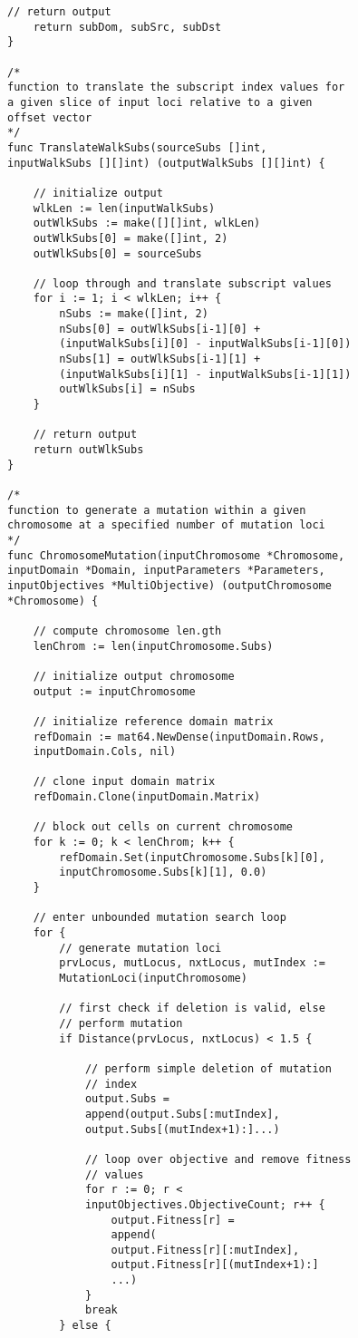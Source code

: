 \begin{lstlisting}[basicstyle=\small]
	// return output
	return subDom, subSrc, subDst
}

/* 
function to translate the subscript index values for 
a given slice of input loci relative to a given 
offset vector
*/
func TranslateWalkSubs(sourceSubs []int, 
inputWalkSubs [][]int) (outputWalkSubs [][]int) {

	// initialize output
	wlkLen := len(inputWalkSubs)
	outWlkSubs := make([][]int, wlkLen)
	outWlkSubs[0] = make([]int, 2)
	outWlkSubs[0] = sourceSubs

	// loop through and translate subscript values
	for i := 1; i < wlkLen; i++ {
		nSubs := make([]int, 2)
		nSubs[0] = outWlkSubs[i-1][0] + 
		(inputWalkSubs[i][0] - inputWalkSubs[i-1][0])
		nSubs[1] = outWlkSubs[i-1][1] + 
		(inputWalkSubs[i][1] - inputWalkSubs[i-1][1])
		outWlkSubs[i] = nSubs
	}

	// return output
	return outWlkSubs
}

/* 
function to generate a mutation within a given 
chromosome at a specified number of mutation loci
*/
func ChromosomeMutation(inputChromosome *Chromosome, 
inputDomain *Domain, inputParameters *Parameters, 
inputObjectives *MultiObjective) (outputChromosome 
*Chromosome) {

	// compute chromosome len.gth
	lenChrom := len(inputChromosome.Subs)

	// initialize output chromosome
	output := inputChromosome

	// initialize reference domain matrix
	refDomain := mat64.NewDense(inputDomain.Rows, 
	inputDomain.Cols, nil)

	// clone input domain matrix
	refDomain.Clone(inputDomain.Matrix)

	// block out cells on current chromosome
	for k := 0; k < lenChrom; k++ {
		refDomain.Set(inputChromosome.Subs[k][0], 
		inputChromosome.Subs[k][1], 0.0)
	}

	// enter unbounded mutation search loop
	for {
		// generate mutation loci
		prvLocus, mutLocus, nxtLocus, mutIndex := 
		MutationLoci(inputChromosome)

		// first check if deletion is valid, else 
		// perform mutation
		if Distance(prvLocus, nxtLocus) < 1.5 {

			// perform simple deletion of mutation 
			// index
			output.Subs = 
			append(output.Subs[:mutIndex], 
			output.Subs[(mutIndex+1):]...)

			// loop over objective and remove fitness 
			// values
			for r := 0; r < 
			inputObjectives.ObjectiveCount; r++ {
				output.Fitness[r] = 
				append(
				output.Fitness[r][:mutIndex], 
				output.Fitness[r][(mutIndex+1):]
				...)
			}
			break
		} else {


\end{lstlisting}
